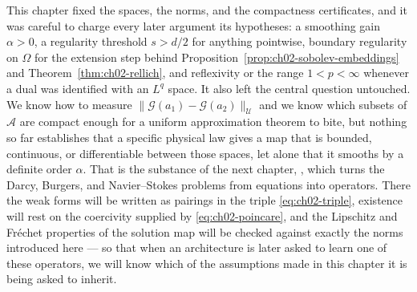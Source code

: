 This chapter fixed the spaces, the norms, and the compactness certificates, and it was careful to charge every later argument its hypotheses: a smoothing gain $\alpha > 0$, a regularity threshold $s > d/2$ for anything pointwise, boundary regularity on $\Omega$ for the extension step behind Proposition~\ref{prop:ch02-sobolev-embeddings} and Theorem~\ref{thm:ch02-rellich}, and reflexivity or the range $1 < p < \infty$ whenever a dual was identified with an $L^q$ space. It also left the central question untouched. We know how to measure $\|\mathcal{G}(a_1) - \mathcal{G}(a_2)\|_{\mathcal{U}}$ and we know which subsets of $\mathcal{A}$ are compact enough for a uniform approximation theorem to bite, but nothing so far establishes that a specific physical law gives a map that is bounded, continuous, or differentiable between those spaces, let alone that it smooths by a definite order $\alpha$. That is the substance of the next chapter, , which turns the Darcy, Burgers, and Navier--Stokes problems from equations into operators. There the weak forms will be written as pairings in the triple \eqref{eq:ch02-triple}, existence will rest on the coercivity supplied by \eqref{eq:ch02-poincare}, and the Lipschitz and Fr\'echet properties of the solution map will be checked against exactly the norms introduced here --- so that when an architecture is later asked to learn one of these operators, we will know which of the assumptions made in this chapter it is being asked to inherit.
